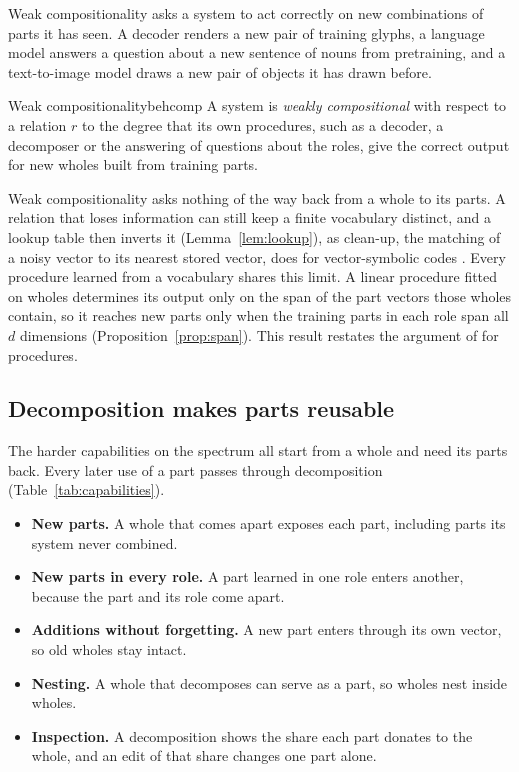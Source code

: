 \documentclass[10pt]{article}
\theoremstyle{plain}
\theoremstyle{remark}
\begin{document}
Weak compositionality asks a system to act correctly on new combinations of parts it has seen. A decoder renders a new pair of training glyphs, a language model answers a question about a new sentence of nouns from pretraining, and a text-to-image model draws a new pair of objects it has drawn before.

\begin{defbox}{Weak compositionality}{behcomp}
A system is \emph{weakly compositional} with respect to a relation $r$ to the degree that its own procedures, such as a decoder, a decomposer or the answering of questions about the roles, give the correct output for new wholes built from training parts.
\end{defbox}

Weak compositionality asks nothing of the way back from a whole to its parts. A relation that loses information can still keep a finite vocabulary distinct, and a lookup table then inverts it (Lemma~\ref{lem:lookup}), as clean-up, the matching of a noisy vector to its nearest stored vector, does for vector-symbolic codes \citep{plate1995}. Every procedure learned from a vocabulary shares this limit. A linear procedure fitted on wholes determines its output only on the span of the part vectors those wholes contain, so it reaches new parts only when the training parts in each role span all $d$ dimensions (Proposition~\ref{prop:span}). This result restates the argument of \citet{marcus1998} for procedures.

\subsection{Decomposition makes parts reusable}
\label{sec:decomposition}

The harder capabilities on the spectrum all start from a whole and need its parts back. Every later use of a part passes through decomposition (Table~\ref{tab:capabilities}).
\begin{itemize}
  \item \textbf{New parts.} A whole that comes apart exposes each part, including parts its system never combined.
  \item \textbf{New parts in every role.} A part learned in one role enters another, because the part and its role come apart.
  \item \textbf{Additions without forgetting.} A new part enters through its own vector, so old wholes stay intact.
  \item \textbf{Nesting.} A whole that decomposes can serve as a part, so wholes nest inside wholes.
  \item \textbf{Inspection.} A decomposition shows the share each part donates to the whole, and an edit of that share changes one part alone.
\end{itemize}
\end{document}
